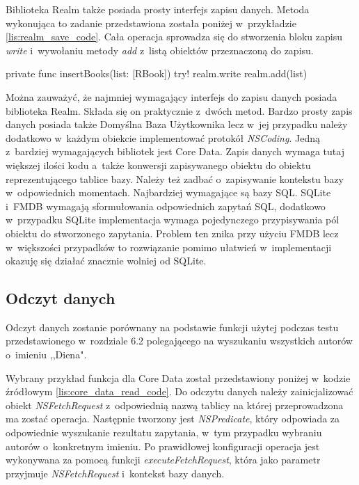 Biblioteka Realm także posiada prosty interfejs zapisu danych. Metoda wykonująca to zadanie przedstawiona została poniżej w~przykładzie \ref{lis:realm_save_code}. Cała operacja sprowadza się do stworzenia bloku zapisu \textit{write} i~wywołaniu metody \textit{add} z~listą obiektów przeznaczoną do zapisu. 

\begin{code}[
		language=swift,
		caption={Przykład zapisu obiektu Realm},
		label={lis:realm_save_code},
	]
    private func insertBooks(list: [RBook]) {
        try! realm.write {
            realm.add(list)
        }
    }
\end{code}

Można zauważyć, że najmniej wymagający interfejs do zapisu danych posiada biblioteka Realm. Składa się on praktycznie z~dwóch metod. Bardzo prosty zapis danych posiada także Domyślna Baza Użytkownika lecz w~jej przypadku należy dodatkowo w~każdym obiekcie implementować protokół \textit{NSCoding}. Jedną z~bardziej wymagających bibliotek jest Core Data. Zapis danych wymaga tutaj większej ilości kodu a~także konwersji zapisywanego obiektu do obiektu reprezentującego tablice bazy. Należy też zadbać o~zapisywanie kontekstu bazy w~odpowiednich momentach. Najbardziej wymagające są bazy SQL. SQLite i~FMDB wymagają sformułowania odpowiednich zapytań SQL, dodatkowo w~przypadku SQLite implementacja wymaga pojedynczego przypisywania pól obiektu do stworzonego zapytania. Problem ten znika przy użyciu FMDB lecz w~większości przypadków to rozwiązanie pomimo ułatwień w~implementacji okazuję się działać znacznie wolniej od SQLite. 

\subsection{Odczyt danych}
Odczyt danych zostanie porównany na podstawie funkcji użytej podczas testu przedstawionego w~rozdziale 6.2 polegającego na wyszukaniu wszystkich autorów o~imieniu ,,Diena". 

Wybrany przykład funkcja dla Core Data został przedstawiony poniżej w~kodzie źródłowym \ref{lis:core_data_read_code}. Do odczytu danych należy zainicjalizować obiekt \textit{NSFetchRequest} z~odpowiednią nazwą tablicy na której przeprowadzona ma zostać operacja. Następnie tworzony jest \textit{NSPredicate}, który odpowiada za odpowiednie wyszukanie rezultatu zapytania, w~tym przypadku wybraniu autorów o~konkretnym imieniu. Po prawidłowej konfiguracji operacja jest wykonywana za pomocą funkcji \textit{executeFetchRequest}, która jako parametr przyjmuje \textit{NSFetchRequest} i~kontekst bazy danych.

